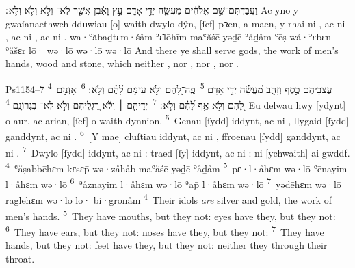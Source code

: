 \begin{example}{5}{4}{28}{}{}
	\quoling
	{וַעֲבַדְתֶּם־שָׁ֣ם אֱלֹהִ֔ים מַעֲשֵׂ֖ה יְדֵ֣י אָדָ֑ם עֵ֣ץ וָאֶ֔בֶן אֲשֶׁ֤ר לֹֽא־ וְלֹ֣א  וְלֹ֥א  וְלֹ֥א ׃}
	{Ac yno y gwaſanaethwch dduwiau [o] waith dwylo dŷn, [ſef] pꝛen, a maen, y rhai ni , ac ni , ac ni , ac ni .}
	{wa·ʿăḇaḏtɛm·šåm ʾɛ̆lōhīm maʿăśē yəḏē ʾåḏåm ʿēṣ wå·ʾɛḇɛn ʾăšɛr lō· wə·lō  wə·lō  wə·lō }
	{And there ye shall serve gods, the work of men’s hands, wood and stone, which neither , nor , nor , nor .}
\end{example}

\begin{example}{Ps}{115}{4–7}{}{}
	\quoling
	{%
		\textsuperscript{4}~עֲצַבֵּיהֶם כֶּ֣סֶף וְזָהָ֑ב מַ֝עֲשֵׂ֗ה יְדֵ֣י אָדָֽם׃
		\textsuperscript{5}~פֶּֽה־לָ֭הֶם וְלֹ֣א  עֵינַ֥יִם לָ֝הֶ֗ם וְלֹ֣א ׃
		\textsuperscript{6}~אָזְנַ֣יִם לָ֭הֶם וְלֹ֣א  אַ֥ף לָ֝הֶ֗ם וְלֹ֣א ׃
		\textsuperscript{7}~יְדֵיהֶ֤ם ׀ וְלֹ֬א  רַ֭גְלֵיהֶם וְלֹ֣א  לֹֽא־ בִּגְרוֹנָֽם׃
	}
	{%
		\textsuperscript{4}~Eu delwau hwy [ydynt] o aur, ac arian, [ſef] o waith dynnion.
		\textsuperscript{5}~Genau [ſydd] iddynt, ac ni , llygaid [ſydd] ganddynt, ac ni .
		\textsuperscript{6}~[Y mae] cluſtiau iddynt, ac ni , ffroenau [ſydd] ganddynt, ac ni .
		\textsuperscript{7}~Dwylo [ſydd] iddynt, ac ni : traed [ſy] iddynt, ac ni : ni  [ychwaith] ai gwddf.
	}
	{%
		\textsuperscript{4}~ʿăṣabbēhɛm kɛsɛp̄ wə·zåhåḇ maʿăśē yəḏē ʾåḏåm
		\textsuperscript{5}~pɛ·l·åhɛm wə·lō  ʿēnayim l·åhɛm wə·lō 
		\textsuperscript{6}~ʾåznayim l·åhɛm wə·lō  ʾap̄ l·åhɛm wə·lō 
		\textsuperscript{7}~yəḏēhɛm wə·lō  raḡlēhɛm wə·lō lō· bi·ḡrōnåm
	}
	{%
		\textsuperscript{4}~Their idols \textit{are} silver and gold, the work of men’s hands.
		\textsuperscript{5}~They have mouths, but they  not: eyes have they, but they  not:
		\textsuperscript{6}~They have ears, but they  not: noses have they, but they  not:
		\textsuperscript{7}~They have hands, but they  not: feet have they, but they  not: neither  they through their throat.
	}
\end{example}



